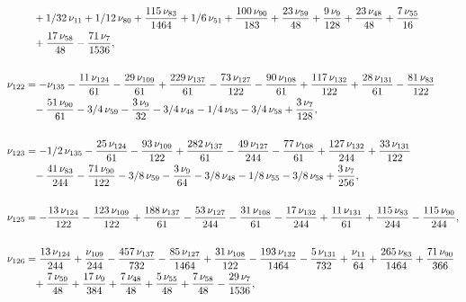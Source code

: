 \documentclass[a4paper,12pt, DIV=14, BCOR=5mm, twoside, headsepline, numbers=noenddot]{scrbook}
\begin{document}
\begin{align}
\begin{aligned}
 &\hphantom{=}+1/32\,\nu_{{11}}
+1/12\,\nu_{{80}}+{\frac {115\,\nu_{{83}}}{1464}}+1/6\,\nu_{{51}}+{
\frac {100\,\nu_{{90}}}{183}}+{\frac {23\,\nu_{{59}}}{48}}+{\frac {9\,
\nu_{{9}}}{128}}+{\frac {23\,\nu_{{48}}}{48}}+{\frac {7\,\nu_{{55}}}{
16}}\\
 &\hphantom{=}+{\frac {17\,\nu_{{58}}}{48}}-{\frac {71\,\nu_{{7}}}{1536}}, \\
\\
\nu_{{
122}}&=-\nu_{{135}}-{\frac {11\,\nu_{{124}}}{61}}-{\frac {29\,\nu_{{109
}}}{61}}+{\frac {229\,\nu_{{137}}}{61}}-{\frac {73\,\nu_{{127}}}{122}}
-{\frac {90\,\nu_{{108}}}{61}}+{\frac {117\,\nu_{{132}}}{122}}+{\frac 
{28\,\nu_{{131}}}{61}}-{\frac {81\,\nu_{{83}}}{122}}\\
 &\hphantom{=}-{\frac {51\,\nu_{
{90}}}{61}}-3/4\,\nu_{{59}}-{\frac {3\,\nu_{{9}}}{32}}-3/4\,\nu_{{48}}
-1/4\,\nu_{{55}}-3/4\,\nu_{{58}}+{\frac {3\,\nu_{{7}}}{128}}, \\
\\
\nu_{{123
}}&=-1/2\,\nu_{{135}}-{\frac {25\,\nu_{{124}}}{61}}-{\frac {93\,\nu_{{
109}}}{122}}+{\frac {282\,\nu_{{137}}}{61}}-{\frac {49\,\nu_{{127}}}{
244}}-{\frac {77\,\nu_{{108}}}{61}}+{\frac {127\,\nu_{{132}}}{244}}+{
\frac {33\,\nu_{{131}}}{122}}\\
 &\hphantom{=}-{\frac {41\,\nu_{{83}}}{244}}-{\frac {71
\,\nu_{{90}}}{122}}-3/8\,\nu_{{59}}-{\frac {3\,\nu_{{9}}}{64}}-3/8\,
\nu_{{48}}-1/8\,\nu_{{55}}-3/8\,\nu_{{58}}+{\frac {3\,\nu_{{7}}}{256}},\\
\\
\nu_{{125}}&=-{\frac {13\,\nu_{{124}}}{122}}-{\frac {123\,\nu_{{109}}
}{122}}+{\frac {188\,\nu_{{137}}}{61}}-{\frac {53\,\nu_{{127}}}{244}}-
{\frac {31\,\nu_{{108}}}{61}}-{\frac {17\,\nu_{{132}}}{244}}+{\frac {
11\,\nu_{{131}}}{61}}+{\frac {115\,\nu_{{83}}}{244}}-{\frac {115\,\nu_
{{90}}}{244}}, \\
\\
\nu_{{126}}&={\frac {13\,\nu_{{124}}}{244}}+{\frac {\nu_{
{109}}}{244}}-{\frac {457\,\nu_{{137}}}{732}}-{\frac {85\,\nu_{{127}}
}{1464}}+{\frac {31\,\nu_{{108}}}{122}}-{\frac {193\,\nu_{{132}}}{1464
}}-{\frac {5\,\nu_{{131}}}{732}}+{\frac {\nu_{{11}}}{64}}+{\frac {265
\,\nu_{{83}}}{1464}}+{\frac {71\,\nu_{{90}}}{366}}\\
 &\hphantom{=}+{\frac {7\,\nu_{{59
}}}{48}}+{\frac {17\,\nu_{{9}}}{384}}+{\frac {7\,\nu_{{48}}}{48}}+{
\frac {5\,\nu_{{55}}}{48}}+{\frac {7\,\nu_{{58}}}{48}}-{\frac {29\,\nu
_{{7}}}{1536}},
\end{aligned}
\end{align}
\end{document}
